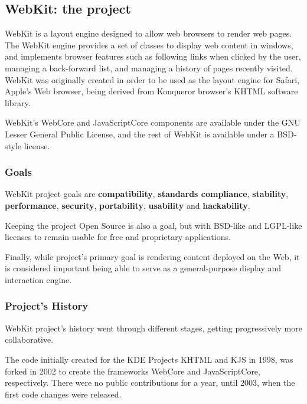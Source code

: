 \documentclass[12pt]{article}
\begin{document}
\subsection{WebKit: the project}

WebKit is a layout engine designed to allow web browsers to render web pages. The WebKit engine provides a set of classes to display web content in windows, and implements browser features such as following links when clicked by the user, managing a back-forward list, and managing a history of pages recently visited. WebKit was originally created in order to be used as the layout engine for Safari, Apple's Web browser, being derived from Konqueror browser's KHTML software library.

WebKit's WebCore and JavaScriptCore components are available under the GNU Lesser General Public License, and the rest of WebKit is available under a BSD-style license\cite{webkit:devcon, webkit:home, wiki:webkit}.

\subsubsection{Goals}

WebKit project goals are \textbf{compatibility}, \textbf{standards compliance}, \textbf{stability}, \textbf{performance}, \textbf{security}, \textbf{portability}, \textbf{usability} and \textbf{hackability}. 

Keeping the project Open Source is also a goal, but with BSD-like and LGPL-like licenses to remain usable for free and proprietary applications. 

Finally, while project's primary goal is rendering content deployed on the Web, it is considered important being able to serve as a general-purpose display and interaction engine\cite{webkit:goals}.

\subsubsection{Project's History}

WebKit project's history went through different stages, getting progressively more collaborative. 

The code initially created for the KDE Projects KHTML and KJS in 1998, was forked in 2002 to create the frameworks WebCore and JavaScriptCore, respectively. There were no public contributions for a year, until 2003, when the first code changes were released\cite{kde:release_mail}. 
\end{document}

